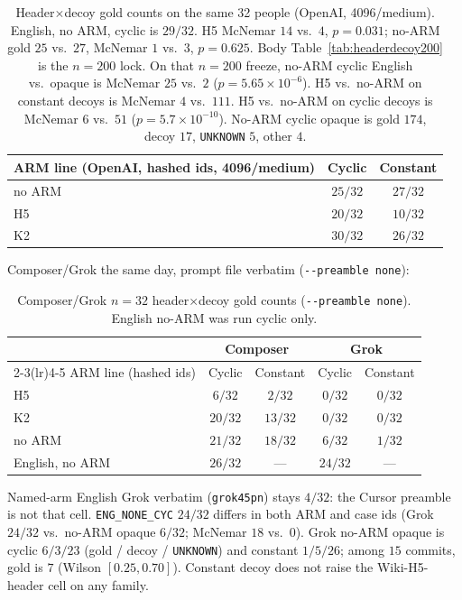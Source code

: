 \documentclass[10pt]{article} %
\begin{document}
\begin{table}[h]
\centering
\small

\caption{Header$\times$decoy gold counts on the same 32 people
(OpenAI, 4096/medium).
English, no ARM, cyclic is $29/32$. H5 McNemar $14$ vs.\ $4$, $p{=}0.031$;
no-ARM gold $25$ vs.\ $27$, McNemar $1$ vs.\ $3$, $p{=}0.625$.
Body Table~\ref{tab:headerdecoy200} is the $n{=}200$ lock.
On that $n{=}200$ freeze, no-ARM cyclic English vs.\ opaque is McNemar $25$ vs.\ $2$
($p{=}5.65{\times}10^{-6}$).
H5 vs.\ no-ARM on constant decoys is McNemar $4$ vs.\ $111$.
H5 vs.\ no-ARM on cyclic decoys is McNemar $6$ vs.\ $51$
($p{=}5.7{\times}10^{-10}$).
No-ARM cyclic opaque is gold $174$, decoy $17$, \texttt{UNKNOWN} $5$,
other $4$.}
\label{tab:headerdecoy}
\begin{tabular}{@{}lcc@{}}
\toprule
ARM line (OpenAI, hashed ids, 4096/medium) & Cyclic & Constant \\
\midrule
no ARM & $25/32$ & $27/32$ \\
H5 & $20/32$ & $10/32$ \\
K2 & $30/32$ & $26/32$ \\
\bottomrule
\end{tabular}

\end{table}

Composer/Grok the same day, prompt file verbatim (\texttt{{-}-preamble none}):

\begin{table}[ht]
\centering
\small
\setlength{\tabcolsep}{4pt}
\begin{tabular}{@{}lcccc@{}}
\toprule
& \multicolumn{2}{c}{Composer} & \multicolumn{2}{c}{Grok} \\
\cmidrule(lr){2-3}\cmidrule(lr){4-5}
ARM line (hashed ids) & Cyclic & Constant & Cyclic & Constant \\
\midrule
H5 & $6/32$ & $2/32$ & $0/32$ & $0/32$ \\
K2 & $20/32$ & $13/32$ & $0/32$ & $0/32$ \\
no ARM & $21/32$ & $18/32$ & $6/32$ & $1/32$ \\
English, no ARM & $26/32$ & --- & $24/32$ & --- \\
\bottomrule
\end{tabular}
\caption{Composer/Grok $n{=}32$ header$\times$decoy gold counts
(\texttt{{-}-preamble none}). English no-ARM was run cyclic only.}
\label{tab:headerdecoy-sdk}
\end{table}

Named-arm English Grok verbatim (\texttt{grok45pn}) stays $4/32$: the
Cursor preamble is not that cell.
\texttt{ENG\_NONE\_CYC} $24/32$ differs in both ARM and case ids
(Grok $24/32$ vs.\ no-ARM opaque $6/32$; McNemar $18$ vs.\ $0$).
Grok no-ARM opaque is cyclic $6/3/23$ (gold / decoy / \texttt{UNKNOWN})
and constant $1/5/26$; among $15$ commits, gold is $7$
(Wilson $[0.25,0.70]$).
Constant decoy does not raise the Wiki-H5-header cell on any family.
\FloatBarrier
\end{document}
